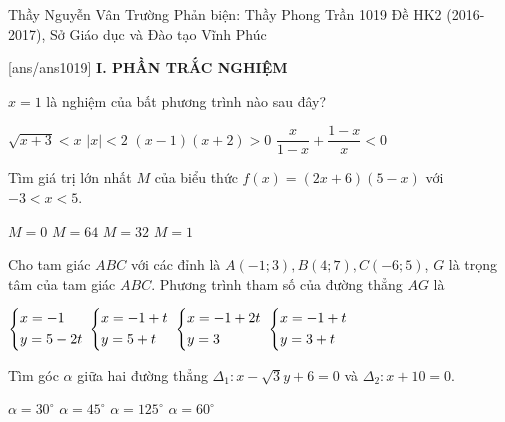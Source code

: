 \begin{name}
{Thầy Nguyễn Vân Trường 
	\newline  Phản biện: Thầy Phong Trần}
		{1019 Đề HK2 (2016-2017), Sở Giáo dục và Đào tạo Vĩnh Phúc}
	\end{name}
	\setcounter{ex}{0}\setcounter{bt}{0}
	[ans/ans1019]
\noindent\textbf{I. PHẦN TRẮC NGHIỆM}
\begin{ex}%
$x=1$ là nghiệm của bất phương trình nào sau đây?

	\choice
{$\sqrt{x+3} < x$}
{\True $|x| < 2$}
{$(x-1)(x+2) > 0$}
{$\dfrac{x}{1-x}+\dfrac{1-x}{x} < 0$}
\end{ex}

\begin{ex}%
Tìm giá trị lớn nhất $M$ của biểu thức $f(x) = (2x+6)(5-x)$ với $-3<x<5$.

	\choice
{$M=0$}
{$M=64$}
{\True $M=32$}
{$M=1$}
\end{ex}

\begin{ex}%
Cho tam giác $ABC$ với các đỉnh là $A(-1;3),B(4;7),C(-6;5)$, $G$ là trọng tâm của tam giác $ABC$. Phương trình tham số của đường thẳng $AG$ là

	\choice
{$\left\{\begin{aligned}& x =-1 \\ & y=5-2t\end{aligned}\right.$}
{$\left\{\begin{aligned}& x =-1+t \\ & y=5+t\end{aligned}\right.$}
{\True $\left\{\begin{aligned}& x =-1+2t \\ & y=3\end{aligned}\right.$}
{$\left\{\begin{aligned}& x =-1+t \\ & y=3+t\end{aligned}\right.$}
\end{ex}

\begin{ex}%
Tìm góc $\alpha$ giữa hai đường thẳng $\Delta_1: x-\sqrt{3}y+6=0$ và $\Delta_2: x+10=0.$

	\choice
{$\alpha=30^\circ$}
{$\alpha=45^\circ$}
{$\alpha=125^\circ$}
{\True $\alpha=60^\circ$}
\end{ex}

